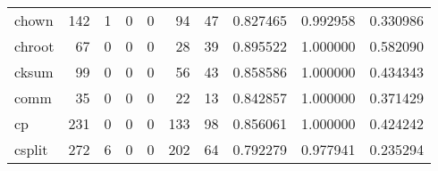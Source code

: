 \begin{tabular}{lrrrrrrrrr}
chown     &                                       142 &                                                  1 &                                                  0 &                                                  0 &                                                 94 &                                                 47 &                                           0.827465 &                               0.992958 &                             0.330986 \\
chroot    &                                        67 &                                                  0 &                                                  0 &                                                  0 &                                                 28 &                                                 39 &                                           0.895522 &                               1.000000 &                             0.582090 \\
cksum     &                                        99 &                                                  0 &                                                  0 &                                                  0 &                                                 56 &                                                 43 &                                           0.858586 &                               1.000000 &                             0.434343 \\
comm      &                                        35 &                                                  0 &                                                  0 &                                                  0 &                                                 22 &                                                 13 &                                           0.842857 &                               1.000000 &                             0.371429 \\
cp        &                                       231 &                                                  0 &                                                  0 &                                                  0 &                                                133 &                                                 98 &                                           0.856061 &                               1.000000 &                             0.424242 \\
csplit    &                                       272 &                                                  6 &                                                  0 &                                                  0 &                                                202 &                                                 64 &                                           0.792279 &                               0.977941 &                             0.235294 \\

\end{tabular}
